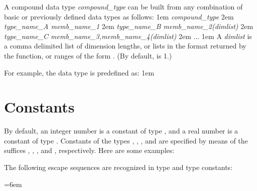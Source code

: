 A compound data type {\it compound\_type} can be built from any combination
of basic or previously defined data types as follows:
\begindemo
\hglue1em {\it compound\_type} \kbd{\{}
\hglue2em {\it type\_name\_A memb\_name\_1} \kbd{;}
\hglue2em {\it type\_name\_B memb\_name\_2(dimlist)} \kbd{;}
\hglue2em {\it type\_name\_C memb\_name\_3,memb\_name\_4(dimlist)} \kbd{;}
\hglue2em ...
\hglue1em\kbd{\}}
\enddemo
A {\it dimlist} is a comma delimited list of dimension lengths, 
or lists in the format returned by the  function, or
ranges of the form .  (By default,
 is 1.)

For example, the  data type is predefined as:
\begindemo
\hglue1em
\enddemo

\shortcopyrightnotice

\section{Constants}

By default, an integer number is a constant of type , and
a real number is a constant of type .  Constants of the
types , , , and  are
specified by means of the suffices , , , and
, respectively.  Here are some examples:


The following escape sequences are recognized in type  and
type  constants:

\keyindent=6em
\endindentedkeys

